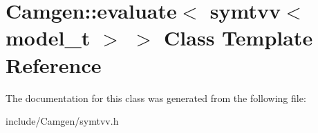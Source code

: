 \hypertarget{a00199}{\section{Camgen\-:\-:evaluate$<$ symtvv$<$ model\-\_\-t $>$ $>$ Class Template Reference}
\label{a00199}
}


The documentation for this class was generated from the following file\-:\begin{DoxyCompactItemize}
\item 
include/\-Camgen/symtvv.\-h\end{DoxyCompactItemize}
